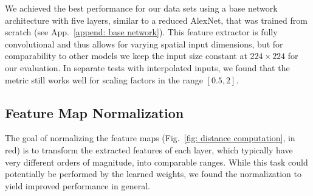 \documentclass{article}
\begin{document}
We achieved the best performance for our data sets using a base network architecture with five layers, similar to a reduced AlexNet, that was trained from scratch (see App.~\ref{append: base network}). This feature extractor is fully convolutional and thus allows for varying spatial input dimensions, but for comparability to other models we keep the input size constant at $224\times224$ for our evaluation. In separate tests with interpolated inputs, we found that the metric still works well for scaling factors in the range $[0.5, 2]$. 

\subsection{Feature Map Normalization} \label{subsec: feature map norm}
The goal of normalizing the feature maps (Fig.~\ref{fig: distance computation}, in red) is to transform the extracted features of each layer, which typically have very different orders of magnitude, into comparable ranges. While this task could potentially be performed by the learned weights, we found the normalization to yield improved performance in general.
\end{document}
